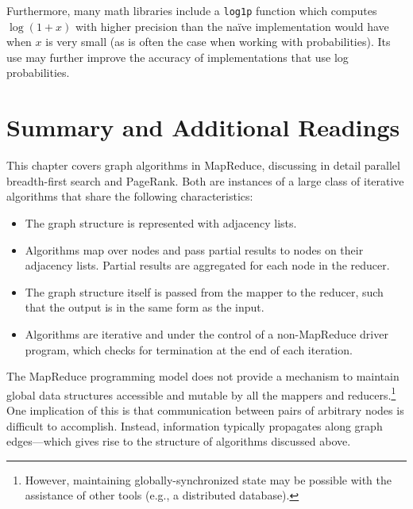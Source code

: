 \noindent Furthermore, many math libraries include a {\tt log1p}
function which computes $\log(1+x)$ with higher precision than the
na\"{i}ve implementation would have when $x$ is very small (as is
often the case when working with probabilities).  Its use may further
improve the accuracy of implementations that use log probabilities.

\section{Summary and Additional Readings}

This chapter covers graph algorithms in MapReduce, discussing in
detail parallel breadth-first search and PageRank.  Both are instances
of a large class of iterative algorithms that share the following
characteristics:

\begin{itemize}

\item The graph structure is represented with adjacency lists.

\item Algorithms map over nodes and pass partial results to nodes on
  their adjacency lists.  Partial results are aggregated for each node
  in the reducer.

\item The graph structure itself is passed from the mapper to the
  reducer, such that the output is in the same form as the input.

\item Algorithms are iterative and under the control of a
  non-MapReduce driver program, which checks for termination at the
  end of each iteration.

\end{itemize}

\noindent The MapReduce programming model does not provide a mechanism
to maintain global data structures accessible and mutable by all the
mappers and reducers.\footnote{However, maintaining
  globally-synchronized state may be possible with the assistance of
  other tools (e.g., a distributed database).} One implication of this
is that communication between pairs of arbitrary nodes is difficult to
accomplish.  Instead, information typically propagates along graph
edges---which gives rise to the structure of algorithms discussed
above.

